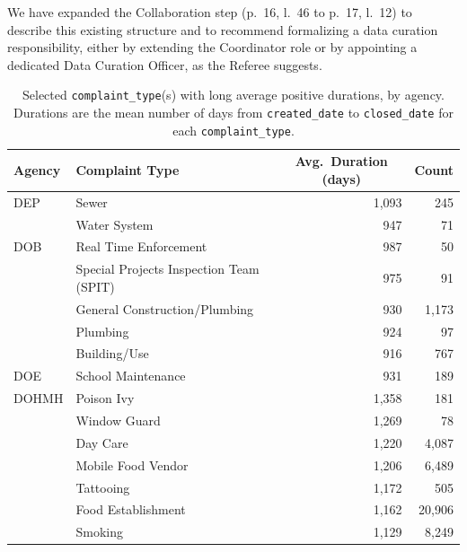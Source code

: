 \documentclass[11pt]{article}
\begin{document}
We have expanded the Collaboration step (p.~16, l.~46 to p.~17, l.~12) to describe
this existing structure and to recommend formalizing a data curation
responsibility, either by extending the Coordinator role or by
appointing a dedicated Data Curation Officer, as the Referee suggests.


\clearpage
\begin{table}[t]
\centering
\small
\caption{Selected \texttt{complaint\_type}(s) with long average positive durations, by 
agency. Durations are the mean number of days from \texttt{created\_date} to
\texttt{closed\_date} for each \texttt{complaint\_type}.}
\label{tab:long-durations}
\begin{tabular}{llrr}
\toprule
Agency & Complaint Type & \multicolumn{1}{c}{Avg.\ Duration (days)} & \multicolumn{1}{c}{Count} \\
\midrule
DEP   & Sewer                                  & 1{,}093 &      245 \\
      & Water System                           &     947 &       71 \\
\midrule
DOB   & Real Time Enforcement                  &     987 &       50 \\
      & Special Projects Inspection Team (SPIT) &    975 &       91 \\
      & General Construction/Plumbing          &     930 &  1{,}173 \\
      & Plumbing                               &     924 &       97 \\
      & Building/Use                           &     916 &      767 \\
\midrule
DOE   & School Maintenance                     &     931 &      189 \\
\midrule
DOHMH & Poison Ivy                             & 1{,}358 &      181 \\
      & Window Guard                           & 1{,}269 &       78 \\
      & Day Care                               & 1{,}220 &  4{,}087 \\
      & Mobile Food Vendor                     & 1{,}206 &  6{,}489 \\
      & Tattooing                              & 1{,}172 &      505 \\
      & Food Establishment                     & 1{,}162 & 20{,}906 \\
      & Smoking                                & 1{,}129 &  8{,}249 \\

\end{tabular}
\end{table}
\end{document}
